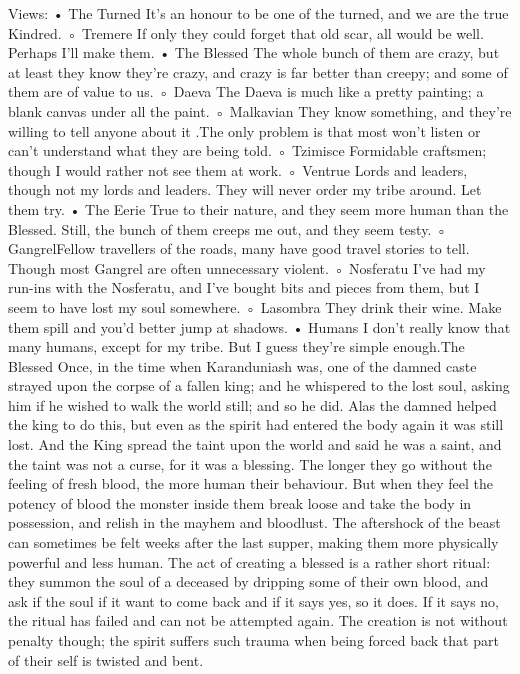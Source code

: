 \documentclass[10pt,a4paper]{article}
\begin{document}
Views:
• The Turned
It's an honour to be one of the turned, and we are the true Kindred.
◦ Tremere
If only they could forget that old scar, all would be well. Perhaps
I'll make them.
• The Blessed
The whole bunch of them are crazy, but at least they know they're
crazy, and crazy is far better than creepy; and some of them are of
value to us.
◦ Daeva
The Daeva is much like a pretty painting; a blank canvas under
all the paint.
◦ Malkavian
They know something, and they're willing to tell anyone about
it .The only problem is that most won't listen or can't understand
what they are being told.
◦ Tzimisce
Formidable craftsmen; though I would rather not see them at
work.
◦ Ventrue
Lords and leaders, though not my lords and leaders. They will
never order my tribe around. Let them try.
• The Eerie
True to their nature, and they seem more human than the Blessed.
Still, the bunch of them creeps me out, and they seem testy.
◦ GangrelFellow travellers of the roads, many have good travel stories to
tell. Though most Gangrel are often unnecessary violent.
◦ Nosferatu
I've had my run-ins with the Nosferatu, and I've bought bits and
pieces from them, but I seem to have lost my soul somewhere.
◦ Lasombra
They drink their wine. Make them spill and you'd better jump at
shadows.
• Humans
I don't really know that many humans, except for my tribe. But I
guess they're simple enough.The Blessed
Once, in the time when Karanduniash was, one of the damned caste strayed
upon the corpse of a fallen king; and he whispered to the lost soul, asking
him if he wished to walk the world still; and so he did. Alas the damned
helped the king to do this, but even as the spirit had entered the body again
it was still lost. And the King spread the taint upon the world and said he
was a saint, and the taint was not a curse, for it was a blessing.
The longer they go without the feeling of fresh blood, the more human their
behaviour. But when they feel the potency of blood the monster inside them
break loose and take the body in possession, and relish in the mayhem and
bloodlust. The aftershock of the beast can sometimes be felt weeks after the
last supper, making them more physically powerful and less human.
The act of creating a blessed is a rather short ritual: they summon the soul of
a deceased by dripping some of their own blood, and ask if the soul if it
want to come back and if it says yes, so it does. If it says no, the ritual has
failed and can not be attempted again. The creation is not without penalty
though; the spirit suffers such trauma when being forced back that part of
their self is twisted and bent.
\end{document}
